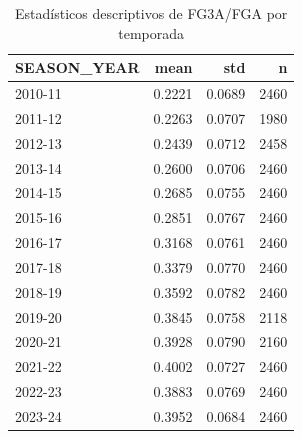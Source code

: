 \begin{table}[H]
\centering
\caption{Estadísticos descriptivos de FG3A/FGA por temporada}
\label{tab:anova-desc-fg3}
\begin{tabular}{lrrr}
\toprule
SEASON\_YEAR & mean & std & n \\
\midrule
2010-11 & 0.2221 & 0.0689 & 2460 \\
2011-12 & 0.2263 & 0.0707 & 1980 \\
2012-13 & 0.2439 & 0.0712 & 2458 \\
2013-14 & 0.2600 & 0.0706 & 2460 \\
2014-15 & 0.2685 & 0.0755 & 2460 \\
2015-16 & 0.2851 & 0.0767 & 2460 \\
2016-17 & 0.3168 & 0.0761 & 2460 \\
2017-18 & 0.3379 & 0.0770 & 2460 \\
2018-19 & 0.3592 & 0.0782 & 2460 \\
2019-20 & 0.3845 & 0.0758 & 2118 \\
2020-21 & 0.3928 & 0.0790 & 2160 \\
2021-22 & 0.4002 & 0.0727 & 2460 \\
2022-23 & 0.3883 & 0.0769 & 2460 \\
2023-24 & 0.3952 & 0.0684 & 2460 \\
\bottomrule
\end{tabular}
\end{table}
